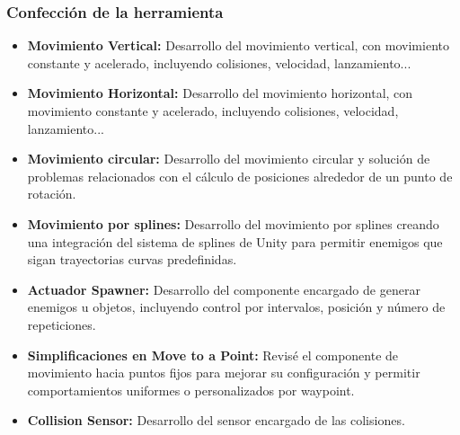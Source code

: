 \subsubsection*{Confección de la herramienta}
\begin{itemize}
  \item \textbf{Movimiento Vertical:} Desarrollo del movimiento vertical, con movimiento constante y acelerado, incluyendo colisiones, velocidad, lanzamiento...
  \item \textbf{Movimiento Horizontal:} Desarrollo del movimiento horizontal, con movimiento constante y acelerado, incluyendo colisiones, velocidad, lanzamiento...
  \item \textbf{Movimiento circular:}  Desarrollo del movimiento circular y solución de problemas relacionados con el cálculo de posiciones alrededor de un punto de rotación.
  \item \textbf{Movimiento por splines:} Desarrollo del movimiento por splines creando una integración del sistema de splines de Unity para permitir enemigos que sigan trayectorias curvas predefinidas.
  \item \textbf{Actuador Spawner:} Desarrollo del componente encargado de generar enemigos u objetos, incluyendo control por intervalos, posición y número de repeticiones.
  \item \textbf{Simplificaciones en Move to a Point:} Revisé el componente de movimiento hacia puntos fijos para mejorar su configuración y permitir comportamientos uniformes o personalizados por waypoint.
  \item \textbf{Collision Sensor:}  Desarrollo del sensor encargado de las colisiones.


\end{itemize}
